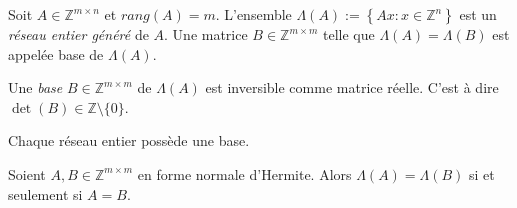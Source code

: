   \begin{definition}
    \label{def:61}
    Soit $A \in \mathbb{Z}^{m\times n}$ et  $rang(A)=m$. L'ensemble  $\Lambda(A):=\left\{ Ax: x\in \mathbb{Z}^{n} \right\}$ est  un \emph{réseau entier généré}  de $A$. Une matrice  $B \in \mathbb{Z}^{m\times m}$ telle que  $\Lambda(A)=\Lambda(B)$ est appelée base de $\Lambda(A)$. 
  \end{definition}

  \begin{remark}
    Une  \emph{base} $B ∈ ℤ^{m ×m}$  de $Λ(A)$ est inversible comme matrice réelle. C'est à dire $\det(B) ∈ℤ \setminus \{ 0\}$. 
  \end{remark}
	
 \begin{corollary}
   \label{co:12}
    Chaque réseau entier possède une base.
  \end{corollary}




  \begin{theorem}
    \label{thr:28}
    Soient $A,B \in \mathbb{Z}^{m\times m}$ en forme normale
    d'Hermite.  Alors $Λ(A) = Λ(B)$ si et seulement si $A = B$.
  \end{theorem}

